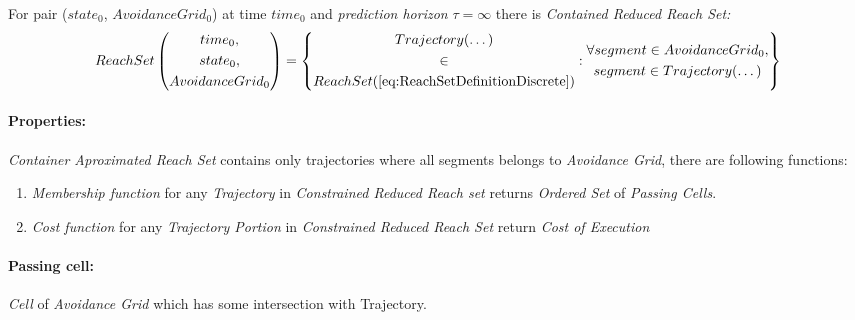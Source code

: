     \begin{definition}\label{def:ContainedReducedReachSet}
        For pair ($state_0$, $AvoidanceGrid_0$) at time $time_0$ and \emph{prediction horizon} $\tau=\infty$ there is \emph{Contained Reduced Reach Set:}
        \begin{equation}\label{eq:containedReachSet}
            ReachSet\left(\begin{gathered}time_0,\\state_0,\\AvoidanceGrid_0\end{gathered}\right) = 
            \left\{
                \begin{gathered}
                Trajectory(\dots) \\\in\\ ReachSet(\ref{eq:ReachSetDefinitionDiscrete})
                \end{gathered}
                :
                \begin{gathered}
                \forall segment \in AvoidanceGrid_0,\\ segment \in Trajectory(\dots)    
                \end{gathered}
            \right\}
        \end{equation}
        
        \paragraph{Properties:} \emph{Container Aproximated Reach Set} contains only trajectories where all segments belongs to \emph{Avoidance Grid}, there are following functions:
        \begin{enumerate}
            \item \emph{Membership function} for any \emph{Trajectory} in \emph{Constrained Reduced Reach set} returns \emph{Ordered Set} of \emph{Passing Cells}. 
            
            \item \emph{Cost function} for any \emph{Trajectory Portion} in \emph{Constrained Reduced Reach Set} return \emph{Cost of Execution}
        \end{enumerate}
        
        \paragraph{Passing cell:} \emph{Cell} of \emph{Avoidance Grid} which has some intersection with {Trajectory}.
    \end{definition}
    
